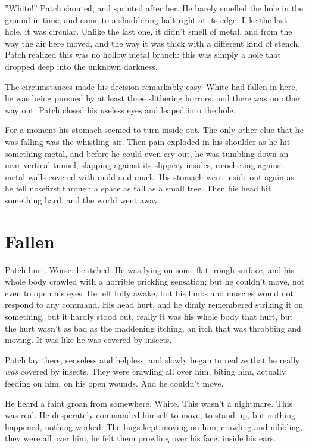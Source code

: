 \documentclass[12pt]{book}
\begin{document}
''White!'' Patch shouted, and sprinted after her. He barely smelled
the hole in the ground in time, and came to a shuddering halt right at
its edge. Like the last hole, it was circular. Unlike the last one, it
didn't smell of metal, and from the way the air here moved, and the
way it was thick with a different kind of stench, Patch realized this
was no hollow metal branch: this was simply a hole that dropped deep
into the unknown darkness.

The circumstances made his decision remarkably easy. White had fallen
in here, he was being pursued by at least three slithering horrors,
and there was no other way out. Patch closed his useless eyes and
leaped into the hole.

For a moment his stomach seemed to turn inside out. The only other
clue that he was falling was the whistling air. Then pain exploded in
his shoulder as he hit something metal, and before he could even cry
out, he was tumbling down an near-vertical tunnel, slapping against
its slippery insides, ricocheting against metal walls covered with
mold and muck. His stomach went inside out again as he fell nosefirst
through a space as tall as a small tree. Then his head hit something
hard, and the world went away.


\section{Fallen}

Patch hurt. Worse: he itched. He was lying on some flat, rough
surface, and his whole body crawled with a horrible prickling
sensation; but he couldn't move, not even to open his eyes. He felt
fully awake, but his limbs and muscles would not respond to any
command. His head hurt, and he dimly remembered striking it on
something, but it hardly stood out, really it was his whole body that
hurt, but the hurt wasn't as bad as the maddening itching, an itch
that was throbbing and moving. It was like he was covered by insects.

Patch lay there, senseless and helpless; and slowly began to realize
that he really \textit{was} covered by insects. They were crawling all
over him, biting him, actually feeding on him, on his open wounds. And
he couldn't move.

He heard a faint groan from somewhere. White. This wasn't a
nightmare. This was real. He desperately commanded himself to move, to
stand up, but nothing happened, nothing worked. The bugs kept moving
on him, crawling and nibbling, they were all over him, he felt them
prowling over his face, inside his ears.
\end{document}
